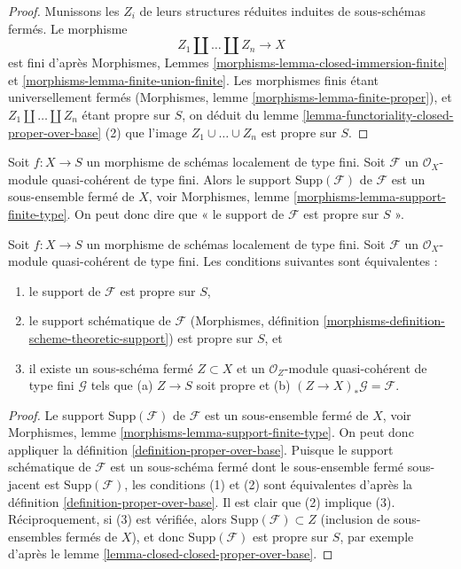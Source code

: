 \begin{proof}
Munissons les $Z_i$ de leurs structures réduites induites de sous-schémas fermés.
Le morphisme
$$
Z_1 \amalg \ldots \amalg Z_n \longrightarrow X
$$
est fini d'après Morphismes, Lemmes
\ref{morphisms-lemma-closed-immersion-finite} et
\ref{morphisms-lemma-finite-union-finite}.
Les morphismes finis étant universellement fermés
(Morphismes, lemme \ref{morphisms-lemma-finite-proper}),
et $Z_1 \amalg \ldots \amalg Z_n$ étant propre sur $S$,
on déduit du
lemme \ref{lemma-functoriality-closed-proper-over-base} (2)
que l'image $Z_1 \cup \ldots \cup Z_n$ est propre sur $S$.
\end{proof}

\noindent
Soit $f : X \to S$ un morphisme de schémas localement de
type fini. Soit $\mathcal{F}$ un
$\mathcal{O}_X$-module quasi-cohérent de type fini. Alors le support $\text{Supp}(\mathcal{F})$
de $\mathcal{F}$ est un sous-ensemble fermé de $X$, voir
Morphismes, lemme \ref{morphisms-lemma-support-finite-type}.
On peut donc dire que «
le support de $\mathcal{F}$ est propre sur $S$ ».

\begin{lemma}
\label{lemma-module-support-proper-over-base}
Soit $f : X \to S$ un morphisme de schémas localement de
type fini. Soit $\mathcal{F}$ un
$\mathcal{O}_X$-module quasi-cohérent de type fini. Les conditions suivantes sont équivalentes :
\begin{enumerate}
\item le support de $\mathcal{F}$ est propre sur $S$,
\item le support schématique de $\mathcal{F}$
(Morphismes, définition \ref{morphisms-definition-scheme-theoretic-support})
est propre sur $S$, et
\item il existe un sous-schéma fermé $Z \subset X$ et
un $\mathcal{O}_Z$-module quasi-cohérent de type fini
$\mathcal{G}$ tels que (a) $Z \to S$ soit propre et (b)
$(Z \to X)_*\mathcal{G} = \mathcal{F}$.
\end{enumerate}
\end{lemma}

\begin{proof}
Le support $\text{Supp}(\mathcal{F})$ de $\mathcal{F}$ est un sous-ensemble fermé
de $X$, voir Morphismes, lemme \ref{morphisms-lemma-support-finite-type}.
On peut donc appliquer la définition \ref{definition-proper-over-base}.
Puisque le support schématique de $\mathcal{F}$ est un sous-schéma
fermé dont le sous-ensemble fermé sous-jacent est $\text{Supp}(\mathcal{F})$,
les conditions (1) et (2) sont équivalentes d'après la
définition \ref{definition-proper-over-base}.
Il est clair que (2) implique (3).
Réciproquement, si (3) est vérifiée, alors
$\text{Supp}(\mathcal{F}) \subset Z$
(inclusion de sous-ensembles fermés de $X$),
et donc $\text{Supp}(\mathcal{F})$
est propre sur $S$, par exemple d'après
le lemme \ref{lemma-closed-closed-proper-over-base}.
\end{proof}

